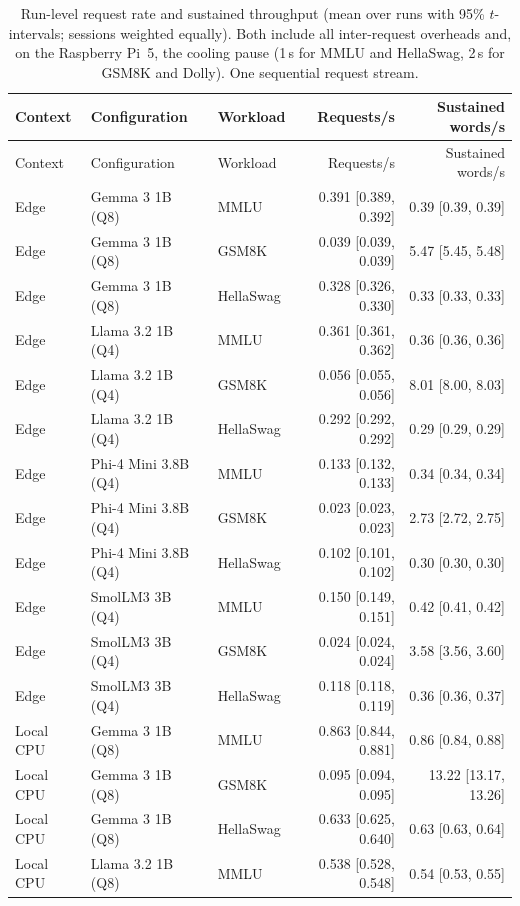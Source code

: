 \begin{longtable}{@{}l l l r r@{}}
\caption{Run-level request rate and sustained throughput (mean over runs with 95\% $t$-intervals; sessions weighted equally). Both include all inter-request overheads and, on the Raspberry Pi~5, the cooling pause (1\,s for MMLU and HellaSwag, 2\,s for GSM8K and Dolly). One sequential request stream.}\label{tab:s2}\\
\toprule
Context & Configuration & Workload & Requests/s & Sustained words/s \\
\midrule\endfirsthead
\toprule
Context & Configuration & Workload & Requests/s & Sustained words/s \\
\midrule\endhead
\bottomrule\endfoot
Edge & Gemma 3 1B (Q8) & MMLU & 0.391 [0.389, 0.392] & 0.39 [0.39, 0.39] \\
Edge & Gemma 3 1B (Q8) & GSM8K & 0.039 [0.039, 0.039] & 5.47 [5.45, 5.48] \\
Edge & Gemma 3 1B (Q8) & HellaSwag & 0.328 [0.326, 0.330] & 0.33 [0.33, 0.33] \\
Edge & Llama 3.2 1B (Q4) & MMLU & 0.361 [0.361, 0.362] & 0.36 [0.36, 0.36] \\
Edge & Llama 3.2 1B (Q4) & GSM8K & 0.056 [0.055, 0.056] & 8.01 [8.00, 8.03] \\
Edge & Llama 3.2 1B (Q4) & HellaSwag & 0.292 [0.292, 0.292] & 0.29 [0.29, 0.29] \\
Edge & Phi-4 Mini 3.8B (Q4) & MMLU & 0.133 [0.132, 0.133] & 0.34 [0.34, 0.34] \\
Edge & Phi-4 Mini 3.8B (Q4) & GSM8K & 0.023 [0.023, 0.023] & 2.73 [2.72, 2.75] \\
Edge & Phi-4 Mini 3.8B (Q4) & HellaSwag & 0.102 [0.101, 0.102] & 0.30 [0.30, 0.30] \\
Edge & SmolLM3 3B (Q4) & MMLU & 0.150 [0.149, 0.151] & 0.42 [0.41, 0.42] \\
Edge & SmolLM3 3B (Q4) & GSM8K & 0.024 [0.024, 0.024] & 3.58 [3.56, 3.60] \\
Edge & SmolLM3 3B (Q4) & HellaSwag & 0.118 [0.118, 0.119] & 0.36 [0.36, 0.37] \\
\midrule
Local CPU & Gemma 3 1B (Q8) & MMLU & 0.863 [0.844, 0.881] & 0.86 [0.84, 0.88] \\
Local CPU & Gemma 3 1B (Q8) & GSM8K & 0.095 [0.094, 0.095] & 13.22 [13.17, 13.26] \\
Local CPU & Gemma 3 1B (Q8) & HellaSwag & 0.633 [0.625, 0.640] & 0.63 [0.63, 0.64] \\
Local CPU & Llama 3.2 1B (Q8) & MMLU & 0.538 [0.528, 0.548] & 0.54 [0.53, 0.55] \\

\end{longtable}
